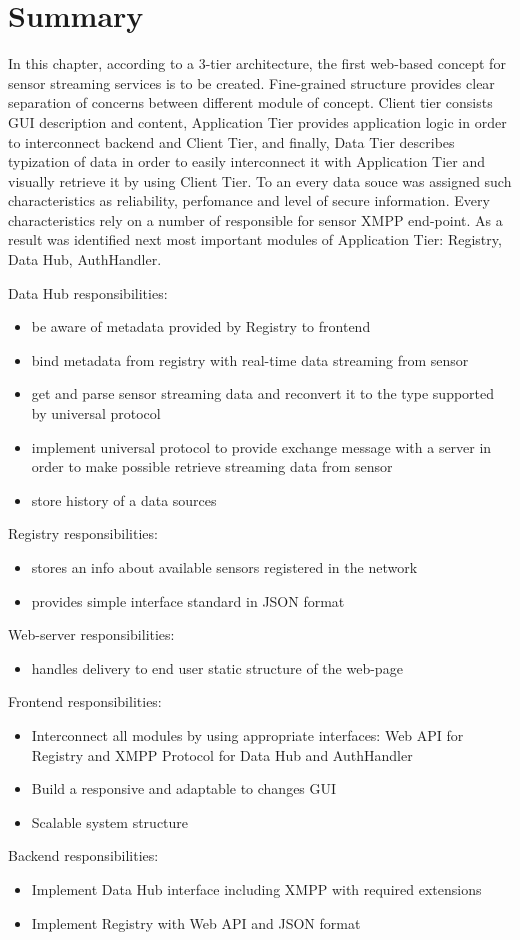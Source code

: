 \section{Summary}
	In this chapter, according to a 3-tier architecture, the first web-based concept for sensor streaming services is to be created. Fine-grained structure provides clear separation of concerns between different module of concept. Client tier consists GUI description and content, Application Tier provides application logic in order to interconnect backend and Client Tier, and finally, Data Tier describes typization of data in order to easily interconnect it with Application Tier and visually retrieve it by using Client Tier. To an every data souce was assigned such characteristics as reliability, perfomance and level of secure information. Every characteristics rely on a number of responsible for sensor XMPP end-point. As a result was identified next most important modules of Application Tier: Registry, Data Hub, AuthHandler. 

  Data Hub responsibilities:
  \begin{itemize}
    \item be aware of metadata provided by Registry to frontend
    \item bind metadata from registry with real-time data streaming from sensor
    \item get and parse sensor streaming data and reconvert it to the type supported by universal protocol
    \item implement universal protocol to provide exchange message with a server in order to make possible retrieve streaming data from sensor
    \item store history of a data sources
  \end{itemize}
  Registry responsibilities:
  \begin{itemize}
  \item stores an info about available sensors registered in the network
  \item provides simple interface standard in JSON format
  \end{itemize}
  Web-server responsibilities:
  \begin{itemize}
  \item handles delivery to end user static structure of the web-page
  \end{itemize}
  Frontend responsibilities:
  \begin{itemize}
  \item Interconnect all modules by using appropriate interfaces: Web API for Registry and XMPP Protocol for Data Hub and AuthHandler
  \item Build a responsive and adaptable to changes GUI
  \item Scalable system structure
  \end{itemize}
    Backend responsibilities:
  \begin{itemize}
  \item Implement Data Hub interface including XMPP with required extensions
  \item Implement Registry with Web API and JSON format
  \end{itemize}